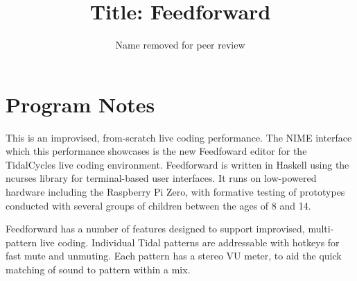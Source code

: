 \documentclass{nimemusic}
\begin{document}
\title{Title: Feedforward}



\author{Name removed for peer review}
\affiliation{%
  \institution{--}
  \city{--}
  \country{--}
}

\renewcommand{\shortauthors}{Removed}




\maketitle

\section{Program Notes}

This is an improvised, from-scratch live coding performance. The NIME
interface which this performance showcases is the new Feedfoward
editor for the TidalCycles live coding environment. Feedforward is
written in Haskell using the ncurses library for terminal-based user
interfaces. It runs on low-powered hardware including the Raspberry Pi
Zero, with formative testing of prototypes conducted with several
groups of children between the ages of 8 and 14.

Feedforward has a number of features designed to support improvised,
multi-pattern live coding. Individual Tidal patterns are addressable
with hotkeys for fast mute and unmuting. Each pattern has a stereo VU
meter, to aid the quick matching of sound to pattern within a mix.
\end{document}
